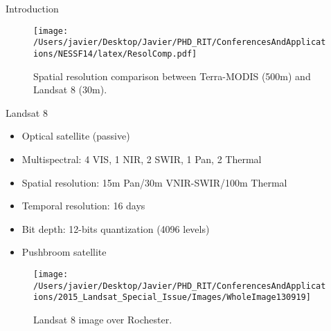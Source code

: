 \documentclass{beamer}
\begin{document}
\begin{frame}{}
\begin{columns}[t]
\begin{column}{.31\linewidth}
\begin{block}{Introduction}
\begin{center}
\begin{figure}[H]
\centering
  \texttt{[image: /Users/javier/Desktop/Javier/PHD\_RIT/ConferencesAndApplications/NESSF14/latex/ResolComp.pdf]}
  \caption{Spatial resolution comparison between Terra-MODIS (500m) and Landsat 8 (30m). \label{fig:resol} } 
\end{figure}
\end{center}
\end{block}
      

\begin{block}{Landsat 8}

\begin{itemize}
	\item Optical satellite (passive)
	\vspace{.2cm}
	\item Multispectral: 4 VIS, 1 NIR, 2 SWIR, 1 Pan, 2 Thermal
	\vspace{.2cm}
	\item Spatial resolution: 15m Pan/30m VNIR-SWIR/100m Thermal
	\vspace{.2cm}
	\item Temporal resolution: 16 days
	\vspace{.2cm}
	\item Bit depth: 12-bits quantization (4096 levels)
	\vspace{.2cm}
	\item Pushbroom satellite
\end{itemize}

\begin{figure}[htb]
  	\centering
  	\texttt{[image: /Users/javier/Desktop/Javier/PHD\_RIT/ConferencesAndApplications/2015\_Landsat\_Special\_Issue/Images/WholeImage130919]}
  \caption{Landsat 8 image over Rochester. \label{fig:Scene} } 
\end{figure}


\end{block}
\end{column}
\end{columns}
\end{frame}
\end{document}
